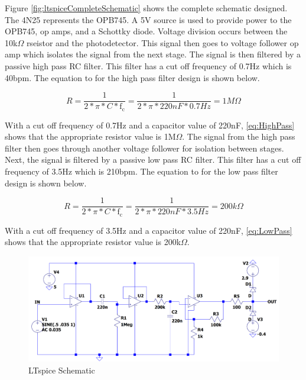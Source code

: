 \documentclass[CMPE]{KGCOEReport}
\begin{document}
Figure \ref{fig:ltspiceCompleteSchematic} shows the complete schematic designed. The 4N25 represents the OPB745. A 5V source is used to provide power to the OPB745, op amps, and a Schottky diode. Voltage division occurs between the 10k$\Omega$ rseistor and the photodetector. This signal then goes to voltage follower op amp which isolates the signal from the next stage. The signal is then filtered by a passive high pass RC filter. This filter has a cut off frequency of 0.7Hz which is 40bpm. The equation to for the high pass filter design is shown below.

\begin{equation}
R = \frac{1}{2*\pi*C*\text{f}_\text{c}} = \frac{1}{2*\pi*220nF*0.7Hz} = 1M\Omega \label{eq:HighPass}
\end{equation}

With a cut off frequency of 0.7Hz and a capacitor value of 220nF, \ref{eq:HighPass} shows that the appropriate resistor value is 1M$\Omega$. The signal from the high pass filter then goes through another voltage follower for isolation between stages. Next, the signal is filtered by a passive low pass RC filter. This filter has a cut off frequency of 3.5Hz which is 210bpm.  The equation to for the low pass filter design is shown below.

\begin{equation}
R = \frac{1}{2*\pi*C*\text{f}_\text{c}} = \frac{1}{2*\pi*220nF*3.5Hz} = 200k\Omega \label{eq:LowPass}
\end{equation}

With a cut off frequency of 3.5Hz and a capacitor value of 220nF, \ref{eq:LowPass} shows that the appropriate resistor value is 200k$\Omega$.

\begin{figure}[H]
    \centering
    \includegraphics[width=1\textwidth]{LTspiceSchematic.png}
    \caption{LTspice Schematic}
    \label{fig:ltspiceSchematic}
\end{figure}
\end{document}
